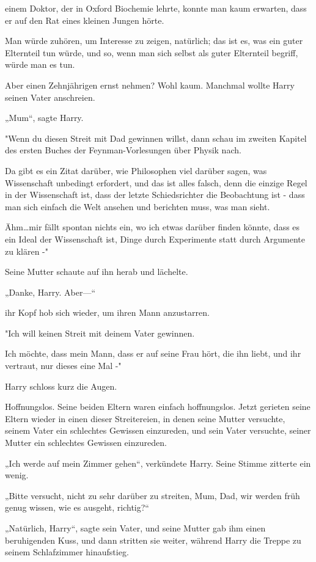 {einem Doktor, der in Oxford Biochemie lehrte, konnte man kaum erwarten, dass er auf den Rat eines kleinen Jungen hörte.

Man würde zuhören, um Interesse zu zeigen, natürlich; das ist es, was ein guter Elternteil tun würde, und so, wenn man sich selbst als guter Elternteil begriff, würde man es tun.

Aber einen Zehnjährigen ernst nehmen? Wohl kaum. Manchmal wollte Harry seinen Vater anschreien.

„Mum“, sagte Harry.

"Wenn du diesen Streit mit Dad gewinnen willst, dann schau im zweiten Kapitel des ersten Buches der Feynman-Vorlesungen über Physik nach.

Da gibt es ein Zitat darüber, wie Philosophen viel darüber sagen, was Wissenschaft unbedingt erfordert, und das ist alles falsch, denn die einzige Regel in der Wissenschaft ist, dass der letzte Schiedsrichter die Beobachtung ist - dass man sich einfach die Welt ansehen und berichten muss, was man sieht.

Ähm…mir fällt spontan nichts ein, wo ich etwas darüber finden könnte, dass es ein Ideal der Wissenschaft ist, Dinge durch Experimente statt durch Argumente zu klären -"

Seine Mutter schaute auf ihn herab und lächelte.

„Danke, Harry. Aber—“

ihr Kopf hob sich wieder, um ihren Mann anzustarren.

"Ich will keinen Streit mit deinem Vater gewinnen.

Ich möchte, dass mein Mann, dass er auf seine Frau hört, die ihn liebt, und ihr vertraut, nur dieses eine Mal -"

Harry schloss kurz die Augen.

Hoffnungslos. Seine beiden Eltern waren einfach hoffnungslos. Jetzt gerieten seine Eltern wieder in einen dieser Streitereien, in denen seine Mutter versuchte, seinem Vater ein schlechtes Gewissen einzureden, und sein Vater versuchte, seiner Mutter ein schlechtes Gewissen einzureden.

„Ich werde auf mein Zimmer gehen“, verkündete Harry. Seine Stimme zitterte ein wenig.

„Bitte versucht, nicht zu sehr darüber zu streiten, Mum, Dad, wir werden früh genug wissen, wie es ausgeht, richtig?“

„Natürlich, Harry“, sagte sein Vater, und seine Mutter gab ihm einen beruhigenden Kuss, und dann stritten sie weiter, während Harry die Treppe zu seinem Schlafzimmer hinaufstieg.

}
